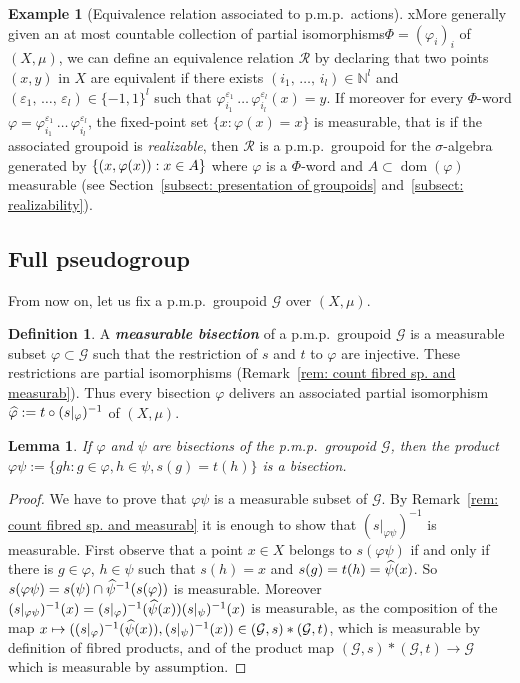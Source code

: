 \documentclass[10pt]{amsart}
\newtheorem{lemm}[cdrthm]{Lemma}
\theoremstyle{definition}
\newtheorem{defi}[cdrthm]{Definition}
\newtheorem{exam}[cdrthm]{Example}
\newcommand{\defin}[1]{\textbf{\emph{#1}}}
\newcommand{\Nmath}{\mathbb{N}}
\newcommand{\RR}{\mathcal{R}}
\newcommand{\cg}{\mathcal{G}}
\DeclareMathOperator{\dom}{dom}
\newcommand{\ph}{\varphi}
\newcommand{\pmp}{p.m.p.\ }
\let\oldhat\hat
\renewcommand*{\hat}[1]{\mathchoice{\widehat{#1}}{\widehat{#1}}{\oldhat{#1}}{\oldhat{#1}}}
\begin{document}
\begin{exam}[Equivalence relation associated to \pmp actions]
xMore generally given an at most countable collection of partial isomorphisms\linebreak$\Phi=(\ph_i)_i$ of $(X,\mu)$, we can define an equivalence relation $\RR$ by declaring that two points $(x,y)$ in $X$ are equivalent if there exists $(i_1,\,\ldots,\,i_l) \in \Nmath^l$ and $(\varepsilon_1,\,\ldots,\,\varepsilon_l) \in \{-1,1\}^l$ such that $\ph_{i_1}^{\varepsilon_{1}}\,\ldots\,\ph_{i_l}^{\varepsilon_{l}}(x)=y$. If moreover for every $\Phi$-word $\ph = \ph_{i_1}^{\varepsilon_{1}}\,\ldots\,\ph_{i_l}^{\varepsilon_{l}}$, the fixed-point set $\{x : \ph(x)=x\}$ is measurable, that is if the associated groupoid is \emph{realizable}, then $\RR$ is a \pmp groupoid for the $\sigma$-algebra generated by $\{(x,\ph(x))\linebreak: x\in A\}$ where $\ph$ is a $\Phi$-word and $A\subset \dom(\ph)$ measurable (see Section~\ref{subsect: presentation of groupoids} and~\ref{subsect: realizability}).
\end{exam}


\subsection{Full pseudogroup}

From now on, let us fix a \pmp groupoid $\cg$ over $(X,\mu)$.

\begin{defi}\label{def: meas. bisection}
A
\defin{measurable bisection} of a \pmp groupoid $\cg$ is a measurable subset $\ph \subset \cg$ such that the restriction of $s$ and $t$ to $\ph$ are injective. These restrictions are partial isomorphisms (Remark~\ref{rem: count fibred sp. and measurab}). Thus every bisection $\ph$ delivers an associated partial isomorphism $\hat \ph:= t \circ (s|_\ph)^{-1}$ of $(X,\mu)$.
\end{defi}

\begin{lemm}
If $\ph$ and $\psi$ are bisections of the \pmp groupoid $\cg$, then the product $\ph\psi:=\{gh:g\in \ph,h \in \psi, s(g)=t(h)\}$ is a bisection.
\end{lemm}
\begin{proof}
We have to prove that $\ph \psi$ is a measurable subset of $\cg$. By Remark~\ref{rem: count fibred sp. and measurab} it is enough to show that $(s|_{\ph\psi})^{-1}$ is measurable. First observe that a point $x \in X$ belongs to $s(\ph \psi)$ if and only if there is $g \in \ph$, $h \in \psi$ such that $s(h)=x$ and $s(g) = t(h)=\hat\psi(x)$. So $s(\ph\psi) = s(\psi) \cap \hat{\psi}^{-1}(s(\ph))$ is measurable. Moreover $(s|_{\ph\psi})^{-1}(x) = (s|_{\ph})^{-1}(\hat{\psi}(x))(s|_{\psi})^{-1}(x)$ is measurable, as the composition of the map $x\mapsto ((s|_{\ph})^{-1}(\hat{\psi}(x)),(s|_{\psi})^{-1}(x)) \in (\cg,s)\ast(\cg,t)$, which is measurable by definition of fibred products, and of the product map $(\cg,s)\ast(\cg,t) \to \cg$ which is measurable by assumption.
\end{proof}
\end{document}
